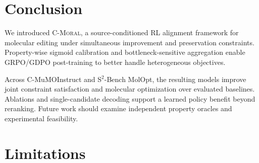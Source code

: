 \documentclass[11pt]{article}
\begin{document}

\section{Conclusion}

We introduced \textsc{C-Moral}, a source-conditioned RL alignment framework for molecular editing under simultaneous improvement and preservation constraints. Property-wise sigmoid calibration and bottleneck-sensitive aggregation enable GRPO/GDPO post-training to better handle heterogeneous objectives.

Across C-MuMOInstruct and S$^2$-Bench MolOpt, the resulting models improve joint constraint satisfaction and molecular optimization over evaluated baselines. Ablations and single-candidate decoding support a learned policy benefit beyond reranking. Future work should examine independent property oracles and experimental feasibility.




\section*{Limitations}
\end{document}
